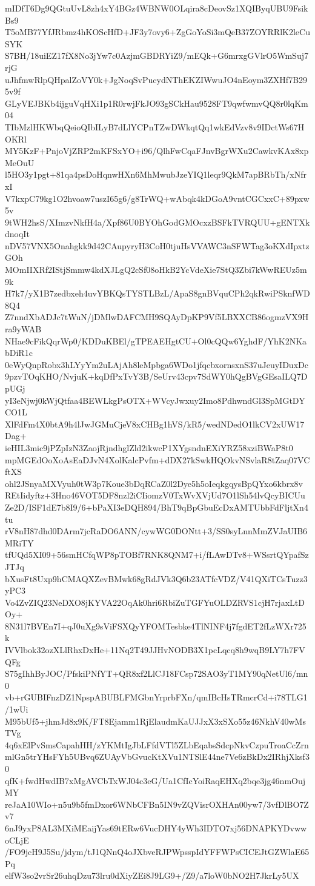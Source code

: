 mIDfT6Dg9QGtuUvL8zh4xY4BGz4WBNW0OLqira8cDeovSz1XQIByqUBU9FsikBs9
T5oMB77YfJRbmz4hKOScHfD+JF3y7ovy6+ZgGoYoSi3mQeB37ZOYRRlK2leCuSYK
S7BH/18uiEZ17fX8No3jYw7c0AzjmGBDRYiZ9/mEQk+G6mrxgGVlrO5WmSuj7rjG
uJhfmwRlpQHpalZoVY0k+JgNoqSvPucydNThEKZIWwuJO4nEoym3ZXHf7B295v9f
GLyVEJBKb4ijguVqHXi1p1R0rwjFkJO93gSCkHau9528FT9qwfwmvQQ8r0lqKm04
TIbMzlHKWbqQeioQIbILyB7dLlYCPnTZwDWkqtQq1wkEdVzv8v9IDctWs67HOKRl
MY5KzF+PnjoVjZRP2mKFSxYO+i96/QlhFwCqaFJnvBgrWXu2CawkvKAx8xpMeOuU
l5HO3y1pgt+81qa4psDoHqnwHXn6MhMwubJzeYIQ1leqr9QkM7apBRbTh/xNfrxI
V7kxpC79kg1O2hvoaw7uszI65g6/g8TrWQ+wAbqk4kDGoA9vntCGCxxC+89pxw5v
9tWH2hsS/XImzvNkfH4a/Xpf86U0BYOhGodGMOcxzBSFkTVRQUU+gENTXkdnoqIt
nDV57VNX5Onahgkk9d42CAupyryH3CoH0tjuHsVVAWC3nSFWTag3oKXdIpxtzGOh
MOmIIXRf2IStjSmmw4kdXJLgQ2cSf08oHkB2YcVdeXie7StQ3Zbi7kWwREUz5m9k
H7k7/yX1B7zedbxeh4uvYBKQsTYSTLBzL/ApaS8gnBVquCPh2qkRwiPSknfWD8Q4
Z7nndXbADJc7tWuN/jDMlwDAFCMH9SQAyDpKP9Vf5LBXXCB86ogmzVX9Hra9yWAB
NHae9cFikQqrWp0/KDDuKBEl/gTPEAEHgtCU+Ol0cQQw6YghdF/YhK2NKabDiR1c
0eWyQnpRobx3hLYyYm2uLAjAh8leMpbga6WDo1jfqcbxornsxnS37uJeuyIDuxDc
9pzvTOqKHO/NvjuK+kqDfPxTvY3B/SeUrv43cpv7SdWY0hQgBVgGEsaILQ7DpUGj
yI3eNjwj0kWjQtfaa4BEWLkgPsOTX+WVcyJwxuy2Imo8PdhwndGl3SpMGtDYCO1L
XlFdFm4X0btA9h4lJwJGMuCjeV8xCHBg1hVS/kR5/wedNDedO1lkCV2xUW17Dag+
ieHIL3mic9jPZpIzN3ZaojRjndhglZld2ikwcP1XYgsndnEXiYRZ58xziBWaP8t0
mpMGEdOoXoAsEaDJvN4XolKalcPvfm+dDX27kSwkHQOkvNSvlaR8tZaq07VCftXS
ohl2JSnyaMXVyuh0tW3p7Koue3bDqRCaZ0l2Dye5h5oIeqkgqysBpQYxo6kbrx8v
REtIidyftz+3Hno46VOT5DF8nzl2iCIiomzV0TxWvXVjUd7O1lSh54lvQcyBICUu
Ze2D/ISF1dE7b8I9/6+bPaXI3eDQH894/BhT9qBpGbuEcDxAMTUbbFdFljtXn4tu
rV8nH87dhd0DArm7jcRaDO6ANN/cywWG0DONtt+3/SS0syLnnMmZVJaUIB6MRiTY
tfUQd5XI09+56smHCfqWP8pTOBf7RNK8QNM7+i/fLAwDTv8+WSsrtQYpafSzJTJq
bXusFt8Uxp9hCMAQXZevBMwk68gRdJVk3Q6b23ATfcVDZ/V41QXiTCsTuzz3yPC3
Vo4ZvZIQ23NeDXO8jKYVA22OqAk0hri6RbiZuTGFYuOLDZRVS1cjH7rjaxLtDOy+
8N31l7BVEn7I+qJ0uXg9sViFSXQyYFOMTesbke4TlNINF4j7fgdET2fLzWXr725k
IVVlbok32ozXLlRhxDxHe+11Nq2T49JJHvNODB3X1pcLqcq8h9wqB9LY7h7FVQFg
S75gIhhByJOC/PfskiPNfYT+QR8xf2LlCJ18FCsp72SAO3yT1MY90qNetUl6/mn0
vb+rGUBIFnzDZ1NpspABUBLFMGbnYrprbFXn/qmIBcHsTRmcrCd+i78TLG1/1wUi
M95bUf5+jhmJd8x9K/FT8Ejamm1RjElaudmKaUJJxX3xSXo55z46NkhV40wMsTVg
4q6xElPvSmsCapahHH/zYKMtIgJbLFfdVTl5ZLbEqabsSdcpNkvCzpuTroaCcZrn
mlGn5trYHsFYh5UBvq6ZUAyVbGvucKtXVu1NTSlE44ne7Ve6zBkDx2IRhjXksf30
qfK+fwdHwdIB7xMgAVCbTxWJ04c3eG/Ua1CfIcYoiRaqEHXq2bqe3jg46nmOujMY
reJaA10WIo+n5u9b5fmDxor6WNbCFBn5IN9vZQVisrOXHAn00yw7/3vfDlBO7Zv7
6nJ9yxP8AL3MXiMEaijYas69tERw6VucDHY4yWh3IDTO7xj56DNAPKYDvwwoCLjE
/FO9jcH9J5Su/jdym/tJ1QNnQ4oJXbveRJPWpsspIdYFFWPsCICEJtGZWlaE65Pq
elfW3so2vrSr26uhqDzu73lru0dXiyZEi8J9LG9+/Z9/a7loW0bNO2H7JkrLy5UX
